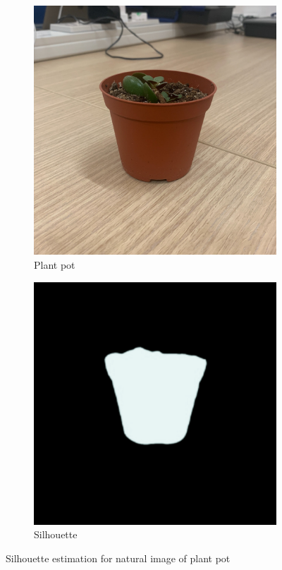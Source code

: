\documentclass{article}
\begin{document}
\begin{figure}[h!]
  \centering
  \begin{subfigure}{.35\textwidth}
    \centering
    \includegraphics[width=\textwidth]{images/natpotpng.jpg}
    \caption{Plant pot}
    \label{natpotpng}
  \end{subfigure}
  \hfill
  \begin{subfigure}{.35\textwidth}
    \centering
    \includegraphics[width=\textwidth]{images/natpotseg.png}
    \caption{Silhouette}
    \label{natpotsil}
  \end{subfigure}
  \caption{Silhouette estimation for natural image of plant pot}
  \label{natpotseg}
\end{figure}
\end{document}
